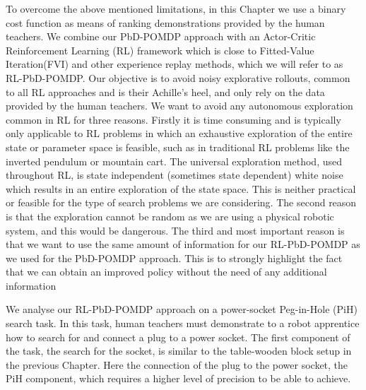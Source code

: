 To overcome the above mentioned limitations, in this Chapter we use a binary cost function as means of ranking demonstrations provided 
by the human teachers. We combine our PbD-POMDP approach with an Actor-Critic Reinforcement Learning (RL) framework which is close to 
Fitted-Value Iteration(FVI) and other experience replay methods, which we will refer to as RL-PbD-POMDP. Our objective 
is to avoid noisy explorative rollouts, common to all RL approaches and is their Achille's heel, and only rely on 
the data provided by the human teachers. We want to avoid any autonomous exploration common in RL for three reasons. 
Firstly it is time consuming and is typically only applicable to RL problems in which an exhaustive exploration 
of the entire state or parameter space is feasible, such as in traditional RL problems like the inverted pendulum or mountain cart. 
The universal exploration method, used throughout RL, is state independent (sometimes state dependent) white noise 
which results in an entire exploration of the state space. This
is neither practical or feasible for the type of search problems we are considering. The second reason is that the 
exploration cannot be random as we are using a physical robotic system, and this would be dangerous. The third and most important reason
is that we want to use the same amount of information for our RL-PbD-POMDP as we used for the PbD-POMDP approach. 
This is to strongly highlight the fact that we can obtain an improved policy without the need of any additional information

We analyse our RL-PbD-POMDP approach on a power-socket Peg-in-Hole (PiH) search task. In this task, human teachers must demonstrate 
to a robot apprentice how to search for and connect a plug to a power socket. The first component of the task, the search for the 
socket, is similar to the table-wooden block setup in the previous Chapter. 
Here the connection of the plug to the power socket, the PiH component, which requires a higher level of precision to be able to achieve.

